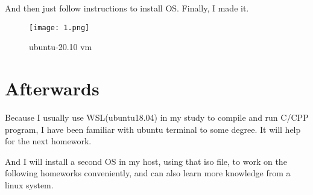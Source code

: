 \documentclass[UTF8,12pt]{ctexart}
\numberwithin{equation}{section}
\begin{document}
And then just follow instructions to install OS.
Finally, I made it.
\begin{figure}[H]
    \centering
    \texttt{[image: 1.png]}
    \caption{ubuntu-20.10 vm}
\end{figure}

\section{Afterwards}
Because I usually use WSL(ubuntu18.04) in my study to compile and run C/CPP program, I have been familiar with ubuntu terminal to some degree.
It will help for the next homework. 

And I will install a second OS in my host, using that iso file, to work on the following homeworks conveniently, and can also learn more knowledge from a linux system.
\end{document}
